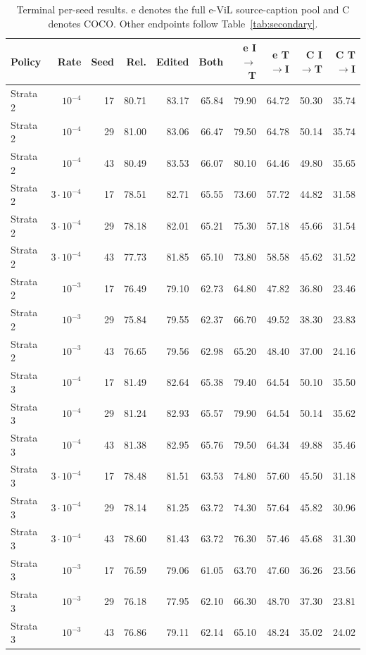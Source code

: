 \begin{table}[t]
\nolinenumbers
\centering
\small
\setlength{\tabcolsep}{3pt}
\begin{tabular}{lrrrrrrrrr}
\toprule
Policy & Rate & Seed & Rel. & Edited & Both & e I$\to$T & e T$\to$I & C I$\to$T & C T$\to$I\\
\midrule
Strata 2 & $10^{-4}$ & 17 & 80.71 & 83.17 & 65.84 & 79.90 & 64.72 & 50.30 & 35.74\\
Strata 2 & $10^{-4}$ & 29 & 81.00 & 83.06 & 66.47 & 79.50 & 64.78 & 50.14 & 35.74\\
Strata 2 & $10^{-4}$ & 43 & 80.49 & 83.53 & 66.07 & 80.10 & 64.46 & 49.80 & 35.65\\
Strata 2 & $3\cdot10^{-4}$ & 17 & 78.51 & 82.71 & 65.55 & 73.60 & 57.72 & 44.82 & 31.58\\
Strata 2 & $3\cdot10^{-4}$ & 29 & 78.18 & 82.01 & 65.21 & 75.30 & 57.18 & 45.66 & 31.54\\
Strata 2 & $3\cdot10^{-4}$ & 43 & 77.73 & 81.85 & 65.10 & 73.80 & 58.58 & 45.62 & 31.52\\
Strata 2 & $10^{-3}$ & 17 & 76.49 & 79.10 & 62.73 & 64.80 & 47.82 & 36.80 & 23.46\\
Strata 2 & $10^{-3}$ & 29 & 75.84 & 79.55 & 62.37 & 66.70 & 49.52 & 38.30 & 23.83\\
Strata 2 & $10^{-3}$ & 43 & 76.65 & 79.56 & 62.98 & 65.20 & 48.40 & 37.00 & 24.16\\
Strata 3 & $10^{-4}$ & 17 & 81.49 & 82.64 & 65.38 & 79.40 & 64.54 & 50.10 & 35.50\\
Strata 3 & $10^{-4}$ & 29 & 81.24 & 82.93 & 65.57 & 79.90 & 64.54 & 50.14 & 35.62\\
Strata 3 & $10^{-4}$ & 43 & 81.38 & 82.95 & 65.76 & 79.50 & 64.34 & 49.88 & 35.46\\
Strata 3 & $3\cdot10^{-4}$ & 17 & 78.48 & 81.51 & 63.53 & 74.80 & 57.60 & 45.50 & 31.18\\
Strata 3 & $3\cdot10^{-4}$ & 29 & 78.14 & 81.25 & 63.72 & 74.30 & 57.64 & 45.82 & 30.96\\
Strata 3 & $3\cdot10^{-4}$ & 43 & 78.60 & 81.43 & 63.72 & 76.30 & 57.46 & 45.68 & 31.30\\
Strata 3 & $10^{-3}$ & 17 & 76.59 & 79.06 & 61.05 & 63.70 & 47.60 & 36.26 & 23.56\\
Strata 3 & $10^{-3}$ & 29 & 76.18 & 77.95 & 62.10 & 66.30 & 48.70 & 37.30 & 23.81\\
Strata 3 & $10^{-3}$ & 43 & 76.86 & 79.11 & 62.14 & 65.10 & 48.24 & 35.02 & 24.02\\
\bottomrule
\end{tabular}
\caption{Terminal per-seed results. e denotes the full e-ViL source-caption pool and C denotes COCO. Other endpoints follow Table~\ref{tab:secondary}.}\label{tab:futerm3}
\end{table}
